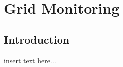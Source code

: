 \graphicspath{{chapt_dutch/}{intro/}{chapt2/}{chapt3/}{chapt4/}{chapt5/}}

\renewcommand\evenpagerightmark{{\scshape\small Grid Monitoring}}
\renewcommand\oddpageleftmark{{\scshape\small Chapter 2}}

\renewcommand{\bibname}{References}

\hyphenation{}

\chapter[Grid Monitoring]%
{Grid Monitoring}
\label{ch2}

\section{Introduction}
insert text here...

\clearpage




\clearpage{\pagestyle{empty}\cleardoublepage}

